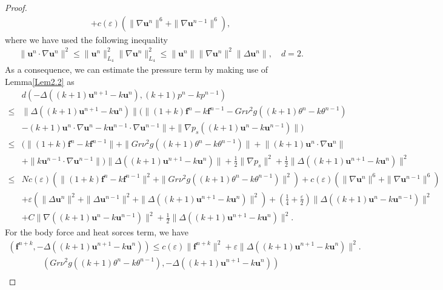 \documentclass[10pt,a4paper]{amsart}
\theoremstyle{thmm}
\begin{document}
\begin{proof}
\begin{align}
			&+c(\varepsilon){ (\|\nabla\bm{u}^{n}\|^6+\|\nabla \bm{u}^{n-1}\|^6)},
		\end{align}
		where we have used the following inequality \cite{J2007}
		\begin{align*}
			&\|\bm{u}^n\cdot\nabla\bm{u}^n\|^2\leq\|\bm{u}^n\|_{L_4}^2\|\nabla\bm{u}^n\|_{L_4}^2\leq\|\bm{u}^n\|\|\nabla\bm{u}^n\|^2\|\Delta\bm{u}^n\|,  \quad    d=2.
		\end{align*}
		As a consequence, we can estimate the pressure term by making use of Lemma\ref{Lem2.2} as
		\begin{align}
			&d(-\Delta((k+1)\bm{u}^{n+1}-k\bm{u}^n),(k+1)p^n-kp^{n-1})\nonumber\\
			\leq &\|\Delta((k+1)\bm{u}^{n+1}-k\bm{u}^n)\|(\|(1+k)\bm{f}^n-k\bm{f}^{n-1}-Gr\nu^2g((k+1)\theta^n-k\theta^{n-1})\nonumber\\
			&  { -(k+1)\bm{u}^n\cdot\nabla\bm{u}^n-k\bm{u}^{n-1}\cdot\nabla\bm{u}^{n-1}\|}+\|\nabla p_s((k+1)\bm{u}^n-k\bm{u}^{n-1})\|)\nonumber\\
			\leq &(\|(1+k)\bm{f}^n-k\bm{f}^{n-1}\|+\|Gr\nu^2g((k+1)\theta^n-k\theta^{n-1})\|+{ \|(k+1)\bm{u}^n\cdot\nabla\bm{u}^n\|}\nonumber\\
			&  +\|k\bm{u}^{n-1}\cdot\nabla\bm{u}^{n-1}\|)\|\Delta((k+1)\bm{u}^{n+1}-k\bm{u}^n)\|+\frac{1}{2}\|\nabla p_s\|^2+\frac{1}{2}\|\Delta((k+1)\bm{u}^{n+1}-k\bm{u}^n)\|^2\nonumber\\
			\leq & Nc(\varepsilon)(\|(1+k)\bm{f}^n-k\bm{f}^{n-1}\|^2+\|Gr\nu^2g((k+1)\theta^n-k\theta^{n-1})\|^2)+c(\varepsilon)({ \|\nabla\bm{u}^{n}\|^6+\|\nabla \bm{u}^{n-1}\|^6})\nonumber\\
			&  +\varepsilon(\|\Delta\bm{u}^n\|^2+\|\Delta\bm{u}^{n-1}\|^2+\|\Delta((k+1)\bm{u}^{n+1}-k\bm{u}^n)\|^2)+(\frac{1}{4}+\frac{\varepsilon}{2})\|\Delta((k+1)\bm{u}^{n}-k\bm{u}^{n-1})\|^2\nonumber\\
			&  +C\|\nabla((k+1)\bm{u}^{n}-k\bm{u}^{n-1})\|^2+\frac{1}{2}\|\Delta((k+1)\bm{u}^{n+1}-k\bm{u}^n)\|^2.
		\end{align}
		For the body force and heat sorces term, we have
		\begin{align}\label{3.22}
			(\bm{f}^{n+k},-\Delta((k+1)\bm{u}^{n+1}-k\bm{u}^n)) \leq c(\varepsilon)\|\bm{f}^{n+k}\|^2+\varepsilon\|\Delta((k+1)\bm{u}^{n+1}-k\bm{u}^n)\|^2. 
		\end{align}
		\begin{align}\label{3.23}
			&(Gr\nu^2g((k+1)\theta^n-k\theta^{n-1}),-\Delta((k+1)\bm{u}^{n+1}-k\bm{u}^n))\nonumber\\

\end{align}
\end{proof}
\end{document}
